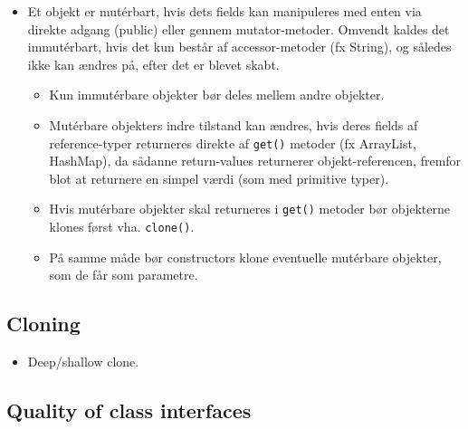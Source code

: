 \begin{itemize}
  \item Et objekt er mutérbart, hvis dets fields kan manipuleres med enten via direkte adgang (public) eller gennem mutator-metoder. Omvendt kaldes det immutérbart, hvis det kun består af accessor-metoder (fx String), og således ikke kan ændres på, efter det er blevet skabt.
  \begin{itemize}
    \item Kun immutérbare objekter bør deles mellem andre objekter.
    \item Mutérbare objekters indre tilstand kan ændres, hvis deres fields af reference-typer returneres direkte af \verb|get()| metoder (fx ArrayList, HashMap), da sådanne return-values returnerer objekt-referencen, fremfor blot at returnere en simpel værdi (som med primitive typer).
    \item Hvis mutérbare objekter skal returneres i \verb|get()| metoder bør objekterne klones først vha. \verb|clone()|.
    \item På samme måde bør constructors klone eventuelle mutérbare objekter, som de får som parametre.
  \end{itemize}
\end{itemize}

\subsection{Cloning}

\begin{itemize}
  \item Deep/shallow clone.
\end{itemize}
  
\subsection{Quality of class interfaces}


